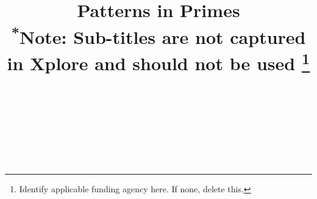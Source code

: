 \documentclass[conference]{IEEEtran}
\begin{document}
\title{Patterns in Primes\\
{\footnotesize \textsuperscript{*}Note: Sub-titles are not captured in Xplore and
should not be used}
\thanks{Identify applicable funding agency here. If none, delete this.}
}

\author{
 \\
\and
{}
 \\
\and
{}
 \\
}

\maketitle

\begin{abstract}

\end{abstract}
\end{document}
